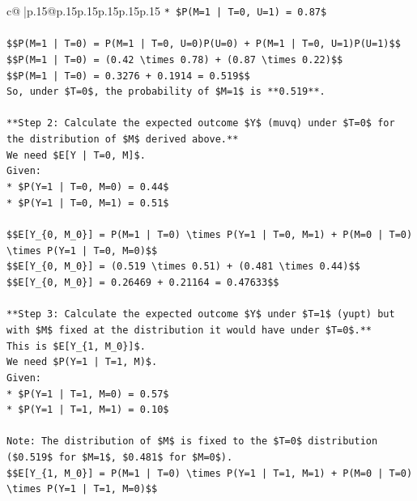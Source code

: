 \documentclass{article}
\begin{document}
{\begin{supertabular}{c@{$\;$}|p{.15\linewidth}@{}p{.15\linewidth}p{.15\linewidth}p{.15\linewidth}p{.15\linewidth}p{.15\linewidth}}
{{{\texttt{*   \$P(M=1 | T=0, U=1) = 0.87\$} \\
\\ 
\texttt{\$\$P(M=1 | T=0) = P(M=1 | T=0, U=0)P(U=0) + P(M=1 | T=0, U=1)P(U=1)\$\$} \\
\texttt{\$\$P(M=1 | T=0) = (0.42 \textbackslash{}times 0.78) + (0.87 \textbackslash{}times 0.22)\$\$} \\
\texttt{\$\$P(M=1 | T=0) = 0.3276 + 0.1914 = 0.519\$\$} \\
\texttt{So, under \$T=0\$, the probability of \$M=1\$ is **0.519**.} \\
\\ 
\texttt{**Step 2: Calculate the expected outcome \$Y\$ (muvq) under \$T=0\$ for the distribution of \$M\$ derived above.**} \\
\texttt{We need \$E{[}Y | T=0, M{]}\$.} \\
\texttt{Given:} \\
\texttt{*   \$P(Y=1 | T=0, M=0) = 0.44\$} \\
\texttt{*   \$P(Y=1 | T=0, M=1) = 0.51\$} \\
\\ 
\texttt{\$\$E{[}Y\_\{0, M\_0\}{]} = P(M=1 | T=0) \textbackslash{}times P(Y=1 | T=0, M=1) + P(M=0 | T=0) \textbackslash{}times P(Y=1 | T=0, M=0)\$\$} \\
\texttt{\$\$E{[}Y\_\{0, M\_0\}{]} = (0.519 \textbackslash{}times 0.51) + (0.481 \textbackslash{}times 0.44)\$\$} \\
\texttt{\$\$E{[}Y\_\{0, M\_0\}{]} = 0.26469 + 0.21164 = 0.47633\$\$} \\
\\ 
\texttt{**Step 3: Calculate the expected outcome \$Y\$ under \$T=1\$ (yupt) but with \$M\$ fixed at the distribution it would have under \$T=0\$.**} \\
\texttt{This is \$E{[}Y\_\{1, M\_0\}{]}\$.} \\
\texttt{We need \$P(Y=1 | T=1, M)\$.} \\
\texttt{Given:} \\
\texttt{*   \$P(Y=1 | T=1, M=0) = 0.57\$} \\
\texttt{*   \$P(Y=1 | T=1, M=1) = 0.10\$} \\
\\ 
\texttt{Note: The distribution of \$M\$ is fixed to the \$T=0\$ distribution (\$0.519\$ for \$M=1\$, \$0.481\$ for \$M=0\$).} \\
\texttt{\$\$E{[}Y\_\{1, M\_0\}{]} = P(M=1 | T=0) \textbackslash{}times P(Y=1 | T=1, M=1) + P(M=0 | T=0) \textbackslash{}times P(Y=1 | T=1, M=0)\$\$} \\
}}}
\end{supertabular}}
\end{document}
